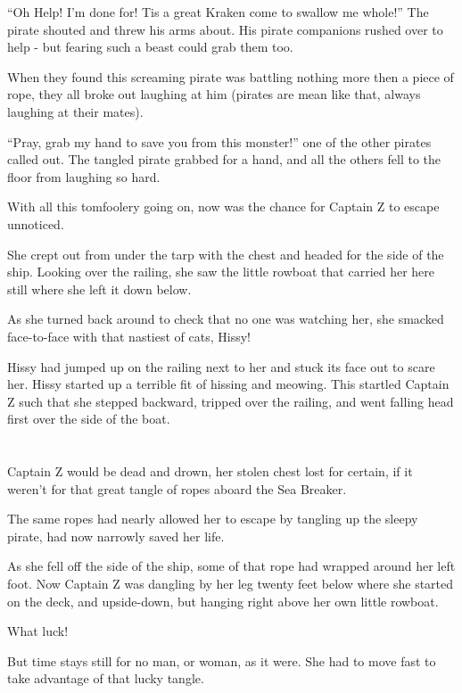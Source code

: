 \documentclass[12pt]{extbook}
\begin{document}
  \enquote{Oh Help! I'm done for! Tis a great Kraken come to swallow me
  whole!} The pirate shouted and threw his arms about. His pirate
  companions rushed over to help - but fearing such a beast could grab
  them too.
  
  When they found this screaming pirate was battling nothing more then a
  piece of rope, they all broke out laughing at him (pirates are mean like
  that, always laughing at their mates).
  
  \enquote{Pray, grab my hand to save you from this monster!} one of the
  other pirates called out. The tangled pirate grabbed for a hand, and all
  the others fell to the floor from laughing so hard.
  
  With all this tomfoolery going on, now was the chance for Captain Z to
  escape unnoticed.
  
  She crept out from under the tarp with the chest and headed for the side
  of the ship. Looking over the railing, she saw the little rowboat that
  carried her here still where she left it down below.
  
  As she turned back around to check that no one was watching her, she
  smacked face-to-face with that nastiest of cats, Hissy!
  
  Hissy had jumped up on the railing next to her and stuck its face out to
  scare her. Hissy started up a terrible fit of hissing and meowing. This
  startled Captain Z such that she stepped backward, tripped over the
  railing, and went falling head first over the side of the boat.
  
  \section{}\label{section-7}
  
  Captain Z would be dead and drown, her stolen chest lost for certain, if
  it weren't for that great tangle of ropes aboard the Sea Breaker.
  
  The same ropes had nearly allowed her to escape by tangling up the
  sleepy pirate, had now narrowly saved her life.
  
  As she fell off the side of the ship, some of that rope had wrapped
  around her left foot. Now Captain Z was dangling by her leg twenty feet
  below where she started on the deck, and upside-down, but hanging right
  above her own little rowboat.
  
  What luck!
  
  But time stays still for no man, or woman, as it were. She had to move
  fast to take advantage of that lucky tangle.
  
\end{document}
